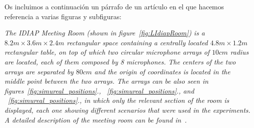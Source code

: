 \documentclass[spanish,openright]{book}
\begin{document}
Os incluimos a continuación un
párrafo de un artículo en el que hacemos referencia a varias figuras y
subfiguras: 

\emph{The IDIAP Meeting Room (shown in figure~\ref{fig:LIdiapRoom}) is a $8.2m
\times 3.6m \times 2.4m$ rectangular space containing a centrally
located $4.8m \times 1.2m$ rectangular table, on top of which two
circular microphone arrays of $10 cm$ radius are located, each of them
composed by 8 microphones. The centers of the two arrays are separated
by $80 cm$ and the origin of coordinates is located in the middle point
between the two arrays. The arrays can be also seen in
figures~\ref{fig:simureal_positions}.,
~\ref{fig:simureal_positions}., and
~\ref{fig:simureal_positions}., in which
only the relevant section of the room is displayed, each one showing
different scenarios that were used in the experiments. A detailed
description of the meeting room can be found in~\cite{moore2002}.}
\end{document}
